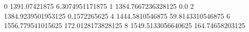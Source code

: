 0 1391.07421875 6.3074951171875
1 1384.7667236328125 0.0
2 1384.9239501953125 0.1572265625
4 1444.5810546875 59.8143310546875
6 1556.779541015625 172.0128173828125
8 1549.5133056640625 164.74658203125
